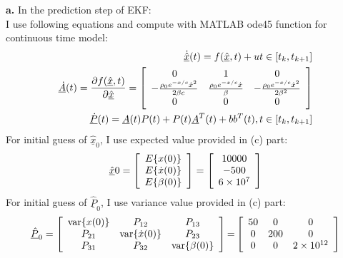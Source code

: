\documentclass{article}
\begin{document}
\noindent \textbf{a.} In the prediction step of EKF:\\
I use following equations and compute with MATLAB ode45 function for continuous time model:
\begin{eqnarray}
	\underline{\dot{\hat{x}}}(t) = f(\underline{\hat{x}},t) + u{\rm{  }}t \in \left[ {t_k ,t_{k + 1} } \right]\\
	\underline{\dot{A}} (t) = \frac{{\partial f(\underline{\hat{x}},t)}}{{\partial \underline{\hat{x}}}} = \left[ {\begin{array}{*{20}c}
	   0 & 1 & 0  \\
	   { - \frac{{\rho _0 e^{ - x/c} \dot x^2 }}{{2\beta c}}} & {\frac{{\rho _0 e^{ - x/c} \dot x}}{\beta }} & { - \frac{{\rho _0 e^{ - x/c} \dot x^2 }}{{2\beta ^2 }}}  \\
	   0 & 0 & 0  \\
	\end{array}} \right]\\
	\underline{\dot{P}} (t) = \underline{A} (t)P(t) + P(t)\underline{A}^T (t) + bb^T (t),{\rm{ }}t \in [t_k ,t_{k + 1} ]
\end{eqnarray}
For initial guess of $\underline{\hat{x}}_0$, I use expected value provided in (c) part:
\begin{equation}
	\underline{\hat{x}}0  = \left[ {\begin{array}{*{20}c}
	   {E\{ x(0)\} }  \\
	   {E\{ \dot x(0)\} }  \\
	   {E\{ \beta (0)\} }  \\
	\end{array}} \right] = \left[ {\begin{array}{*{20}c}
	   {10000}  \\
	   { - 500}  \\
	   {6 \times 10^7 }  \\
	\end{array}} \right]
\end{equation}
For initial guess of $\underline{\hat{P}}_0$, I use variance value provided in (c) part:
\begin{equation}
\underline{\hat{P}}_0  = \left[ {\begin{array}{*{20}c}
   {{\mathop{\rm var}} \{ x(0)\} } & {P_{12} } & {P_{13} }  \\
   {P_{21} } & {{\mathop{\rm var}} \{ \dot x(0)\} } & {P_{23} }  \\
   {P_{31} } & {P_{32} } & {{\mathop{\rm var}} \{ \beta (0)\} }  \\
\end{array}} \right]{\rm{ = }}\left[ {\begin{array}{*{20}c}
   {50} & 0 & 0  \\
   0 & {200} & 0  \\
   0 & 0 & {2 \times 10^{12} }  \\
\end{array}} \right]
\end{equation}
\end{document}
